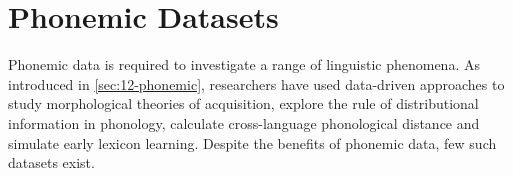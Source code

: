 


\section{Phonemic Datasets}\label{sec:13-phonemicdatasets}


Phonemic data is required to investigate a range of linguistic phenomena. As introduced in \cref{sec:12-phonemic}, researchers have used data-driven approaches to study morphological theories of acquisition, explore the rule of distributional information in phonology, calculate cross-language phonological distance and simulate early lexicon learning. Despite the benefits of phonemic data, few such datasets exist. 

